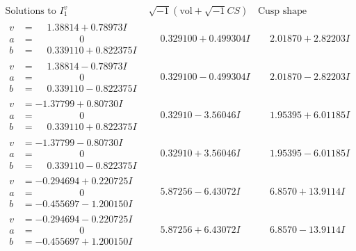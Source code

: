 \documentclass[1p]{elsarticle_modified}
\theoremstyle{definition}
\newcommand{\I}{\sqrt{-1}}
\begin{document}
$$\begin{array}{c|c|c}  
\text{Solutions to }I^v_{1}& \I (\text{vol} + \sqrt{-1}CS) & \text{Cusp shape}\\
 \hline 
\begin{aligned}
v &= \phantom{-}1.38814 + 0.78973 I \\
a &= \phantom{-0.000000 } 0 \\
b &= \phantom{-}0.339110 + 0.822375 I\end{aligned}
 & \phantom{-}0.329100 + 0.499304 I & \phantom{-}2.01870 + 2.82203 I \\ \hline\begin{aligned}
v &= \phantom{-}1.38814 - 0.78973 I \\
a &= \phantom{-0.000000 } 0 \\
b &= \phantom{-}0.339110 - 0.822375 I\end{aligned}
 & \phantom{-}0.329100 - 0.499304 I & \phantom{-}2.01870 - 2.82203 I \\ \hline\begin{aligned}
v &= -1.37799 + 0.80730 I \\
a &= \phantom{-0.000000 } 0 \\
b &= \phantom{-}0.339110 + 0.822375 I\end{aligned}
 & \phantom{-}0.32910 - 3.56046 I & \phantom{-}1.95395 + 6.01185 I \\ \hline\begin{aligned}
v &= -1.37799 - 0.80730 I \\
a &= \phantom{-0.000000 } 0 \\
b &= \phantom{-}0.339110 - 0.822375 I\end{aligned}
 & \phantom{-}0.32910 + 3.56046 I & \phantom{-}1.95395 - 6.01185 I \\ \hline\begin{aligned}
v &= -0.294694 + 0.220725 I \\
a &= \phantom{-0.000000 } 0 \\
b &= -0.455697 - 1.200150 I\end{aligned}
 & \phantom{-}5.87256 - 6.43072 I & \phantom{-}6.8570 + 13.9114 I \\ \hline\begin{aligned}
v &= -0.294694 - 0.220725 I \\
a &= \phantom{-0.000000 } 0 \\
b &= -0.455697 + 1.200150 I\end{aligned}
 & \phantom{-}5.87256 + 6.43072 I & \phantom{-}6.8570 - 13.9114 I \\ \hline\begin{aligned}

\end{aligned}
\end{array}$$
\end{document}
